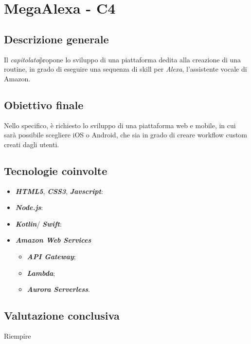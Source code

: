 \section{MegaAlexa - C4} \label{c4}
    \subsection{Descrizione generale}
    Il \textit{capitolato}\G propone lo sviluppo di una piattaforma
    dedita alla creazione di una routine, in grado di eseguire una sequenza
    di skill per \textit{Alexa}\GAlt, l'assistente vocale di Amazon.

    \subsection{Obiettivo finale}
    Nello specifico, \`e richiesto lo sviluppo di una piattaforma web e
    mobile, in cui sarà possibile scegliere iOS o Android, che sia in grado di 
    creare workflow custom creati dagli utenti.

    \subsection{Tecnologie coinvolte}
    \begin{itemize}
        \item \textit{\textbf{HTML5}}\GAlt, \textit{\textbf{CSS3}}\GAlt, \textit{\textbf{Javscript}}\GAlt:
        \item \textit{\textbf{Node.js}}\GAlt:
        \item \textit{\textbf{Kotlin}}\GAlt / \textit{\textbf{Swift}}\GAlt:
        \item \textit{\textbf{Amazon Web Services}}\GAlt
            \begin{itemize}
                \item \textit{\textbf{API Gateway}}\GAlt;
                \item \textit{\textbf{Lambda}}\GAlt;
                \item \textit{\textbf{Aurora Serverless}}\GAlt.
            \end{itemize}
    \end{itemize}

    \subsection{Valutazione conclusiva}
    Riempire

